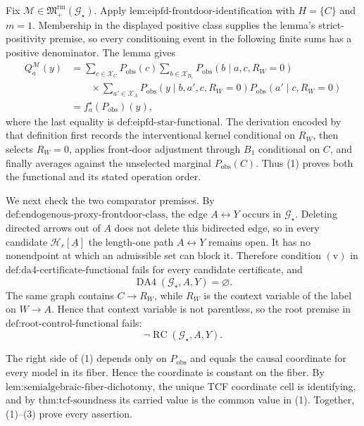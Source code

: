 Fix \(\mathcal M\in\mathfrak M_{+}^{\mathrm{rm}}(\mathcal G_\star)\).  Apply \(\text{lem:eipfd-frontdoor-identification}\) with \(H=\{C\}\) and \(m=1\).  Membership in the displayed positive class supplies the lemma's strict-positivity premise, so every conditioning event in the following finite sums has a positive denominator.  The lemma gives
\[
\begin{aligned}
Q_a^{\mathcal M}(y)
&=\sum_{c\in\mathcal X_C}P_{\mathrm{obs}}(c)
\sum_{b\in\mathcal X_{B_1}}P_{\mathrm{obs}}(b\mid a,c,R_W=0)\\
&\qquad\times\sum_{a'\in\mathcal X_A}
P_{\mathrm{obs}}(y\mid b,a',c,R_W=0)
P_{\mathrm{obs}}(a'\mid c,R_W=0)\\
&=f_a^\star(P_{\mathrm{obs}})(y),
\end{aligned}
\tag{1}
\]
where the last equality is \(\text{def:eipfd-star-functional}\).  The derivation encoded by that definition first records the interventional kernel conditional on \(R_W\), then selects \(R_W=0\), applies front-door adjustment through \(B_1\) conditional on \(C\), and finally averages against the unselected marginal \(P_{\mathrm{obs}}(C)\).  Thus (1) proves both the functional and its stated operation order.

We next check the two comparator premises.  By \(\text{def:endogenous-proxy-frontdoor-class}\), the edge \(A\leftrightarrow Y\) occurs in \(\mathcal G_\star\).  Deleting directed arrows out of \(A\) does not delete this bidirected edge, so in every candidate \(\mathcal H_r[\underline A]\) the length-one path \(A\leftrightarrow Y\) remains open.  It has no nonendpoint at which an admissible set can block it.  Therefore condition \(\mathrm{(v)}\) in \(\text{def:da4-certificate-functional}\) fails for every candidate certificate, and
\[
\operatorname{DA4}(\mathcal G_\star,A,Y)=\varnothing.
\tag{2}
\]
The same graph contains \(C\to R_W\), while \(R_W\) is the context variable of the label on \(W\to A\).  Hence that context variable is not parentless, so the root premise in \(\text{def:root-control-functional}\) fails:
\[
\neg\operatorname{RC}(\mathcal G_\star,A,Y).
\tag{3}
\]

The right side of (1) depends only on \(P_{\mathrm{obs}}\) and equals the causal coordinate for every model in its fiber.  Hence the coordinate is constant on the fiber.  By \(\text{lem:semialgebraic-fiber-dichotomy}\), the unique TCF coordinate cell is identifying, and by \(\text{thm:tcf-soundness}\) its carried value is the common value in (1).  Together, (1)--(3) prove every assertion.